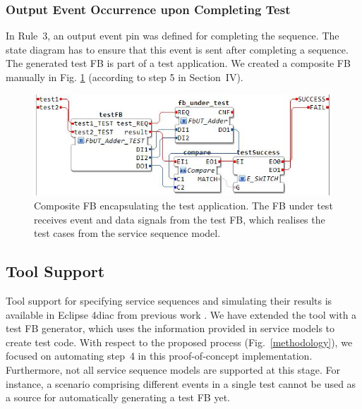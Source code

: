 \begin{bibunit}
\subsubsection{Output Event Occurrence upon Completing Test}
In Rule~3, an output event pin was defined for completing the sequence. The state diagram has to ensure that this event is sent after completing a sequence.
The generated test FB is part of a test application. We created a composite FB manually in Fig. \ref{fig:compfb} (according to step 5 in Section~IV).
\begin{figure}[htbp]
    \centering
    \includegraphics[width=\columnwidth]{MX_Papers/Paper9/Figures/compositeFb.JPG}
    \caption{Composite FB encapsulating the test application. The FB under test receives event and data signals from the test FB, which realises the test cases from the service sequence model.}
    \label{fig:compfb}
\end{figure}
\subsection{Tool Support}
Tool support for specifying service sequences and simulating their results is available in Eclipse 4diac \cite{eclipse4diac} from previous work \cite{wiesmayr2021}. We have extended the tool with a test FB generator, which uses the information provided in service models to create test code. With respect to the proposed process (Fig.~\ref{methodology}), we focused on automating step~4 in this proof-of-concept implementation. Furthermore, not all service sequence models are supported at this stage. For instance, a scenario comprising different events in a single test cannot be used as a source for automatically generating a test FB yet.


\end{bibunit}
